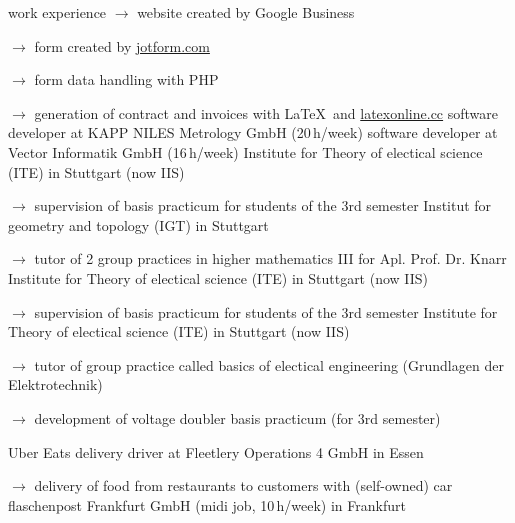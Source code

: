 \begin{rubric}{\textcolor{black!20!blue!100}{work experience}}
			\setlength{\hangindent}{\widthof{$\rightarrow$ }}
			$\rightarrow$ website created by Google Business

			$\rightarrow$ form created by \href{https://www.jotform.com/}{jotform.com}

			$\rightarrow$ form data handling with PHP

			$\rightarrow$ generation of contract and invoices with \LaTeX\ and \href{https://latexonline.cc/}{latexonline.cc}
%			
		\entry*[10/2024 --- 01/2025]
			software developer at KAPP NILES Metrology GmbH (20\,h/week)
		\entry*[05/2016 --- 10/2017]
			software developer at Vector Informatik GmbH (16\,h/week)
		\entry*[10/2015 --- 03/2016]
			Institute for Theory of electical science (ITE) in Stuttgart (now IIS)
				
			\setlength{\hangindent}{\widthof{$\rightarrow$ }}
			$\rightarrow$ supervision of basis practicum for students of the 3rd semester
		\entry*
			Institut for geometry and topology (IGT) in Stuttgart
			
			\setlength{\hangindent}{\widthof{$\rightarrow$ }}
			$\rightarrow$ tutor of 2 group practices in higher mathematics III for Apl. Prof. Dr. Knarr
		\entry*[10/2014 --- 03/2015]
			Institute for Theory of electical science (ITE) in Stuttgart (now IIS)
			
			\setlength{\hangindent}{\widthof{$\rightarrow$ }}
			$\rightarrow$ supervision of basis practicum for students of the 3rd semester
		\entry*[10/2013 --- 03/2014]
			Institute for Theory of electical science (ITE) in Stuttgart (now IIS)
			
			\setlength{\hangindent}{\widthof{$\rightarrow$ }}
			$\rightarrow$ tutor of group practice called basics of electical engineering (\glqq Grundlagen der Elektrotechnik\grqq)
			
			$\rightarrow$ development of voltage doubler basis practicum (for 3rd semester)
	
		\entry*[29/07/2026 --- 28/09/2026]
			Uber Eats delivery driver at Fleetlery Operations 4 GmbH in Essen
			
			\setlength{\hangindent}{\widthof{$\rightarrow$ }}
			$\rightarrow$ delivery of food from restaurants to customers with (self-owned) car
		\entry*[23/03/2024 --- 26/04/2024]
			flaschenpost Frankfurt GmbH (midi job, 10\,h/week) in Frankfurt
			

\end{rubric}
